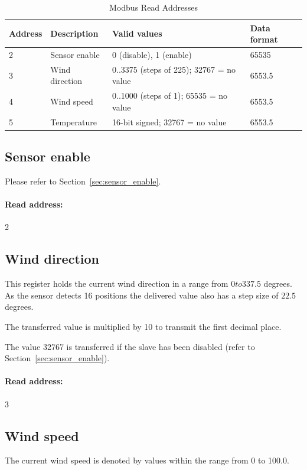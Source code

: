 \begin{table}[ht]
    \label{tab:modbus_read}
    \centering
    \begin{tabular}{|l|l|l|l|}
    \hline \textbf{Address} & \textbf{Description} & \textbf{Valid values} & \textbf{Data format} \\ 
    \hline
    \hline 2 & Sensor enable & 0 (disable), 1 (enable) & 65535 \\ 
    \hline 3 & Wind direction & 0..3375 (steps of 225); 32767 = no value & 6553.5 \\ 
    \hline 4 & Wind speed & 0..1000 (steps of 1); 65535 = no value & 6553.5 \\ 
    \hline 5 & Temperature & 16-bit signed; 32767 = no value & 6553.5 \\ 
    \hline 
    \end{tabular}
    \caption{Modbus Read Addresses}
\end{table}

\subsection{Sensor enable}
Please refer to Section~\ref{sec:sensor_enable}.

\paragraph{Read address:} 2

\subsection{Wind direction}
This register holds the current wind direction in a range from $0 to 337.5$ degrees. As the sensor detects 16 positions the delivered value also has a step size of $22.5$ degrees.

The transferred value is multiplied by 10 to transmit the first decimal place.

The value 32767 is transferred if the slave has been disabled (refer to Section~\ref{sec:sensor_enable}).

\paragraph{Read address:} 3

\subsection{Wind speed}
The current wind speed is denoted by values within the range from 0 to 100.0.

